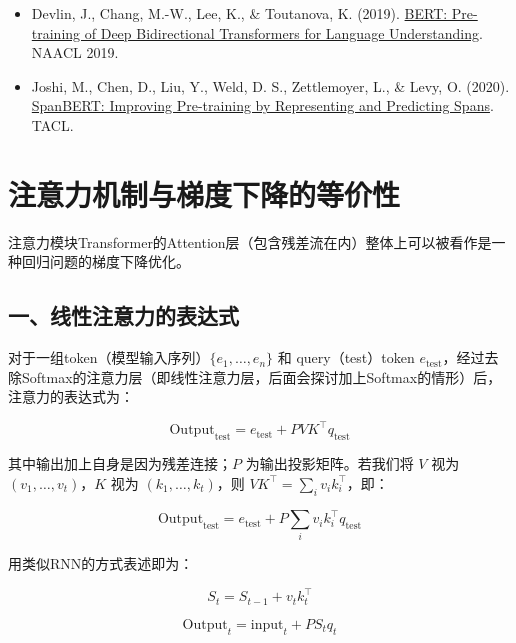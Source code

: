 \vspace{0.25em}
\begin{itemize}
\tightlist
\item
  Devlin, J., Chang, M.-W., Lee, K., \& Toutanova, K. (2019). \href{https://arxiv.org/abs/1810.04805}{BERT: Pre-training of Deep Bidirectional Transformers for Language Understanding}. NAACL 2019.
\item
  Joshi, M., Chen, D., Liu, Y., Weld, D. S., Zettlemoyer, L., \& Levy, O. (2020). \href{https://arxiv.org/abs/1907.10529}{SpanBERT: Improving Pre-training by Representing and Predicting Spans}. TACL.
\end{itemize}

\clearpage

\hypertarget{ux6ce8ux610fux529bux673aux5236ux4e0eux68afux5ea6ux4e0bux964dux7684ux7b49ux4ef7ux6027}{%
\section{注意力机制与梯度下降的等价性}\label{ux6ce8ux610fux529bux673aux5236ux4e0eux68afux5ea6ux4e0bux964dux7684ux7b49ux4ef7ux6027}}

注意力模块Transformer的Attention层（包含残差流在内）整体上可以被看作是一种回归问题的梯度下降优化。

\hypertarget{ux4e00ux7ebfux6027ux6ce8ux610fux529bux7684ux8868ux8fbeux5f0f}{%
\subsection{一、线性注意力的表达式}\label{ux4e00ux7ebfux6027ux6ce8ux610fux529bux7684ux8868ux8fbeux5f0f}}

对于一组token（模型输入序列）\(\{e_1,\ldots,e_n\}\) 和 query（test）token \(e_{\mathrm{test}}\)，经过去除Softmax的注意力层（即线性注意力层，后面会探讨加上Softmax的情形）后，注意力的表达式为：

\[
\mathrm{Output}_{\mathrm{test}}=e_{\mathrm{test}}+PVK^\top q_{\mathrm{test}}
\tag{1}
\]

其中输出加上自身是因为残差连接；\(P\) 为输出投影矩阵。若我们将 \(V\) 视为 \((v_1,\ldots,v_t)\)，\(K\) 视为 \((k_1,\ldots,k_t)\)，则 \(VK^\top=\sum_i v_i k_i^\top\)，即：

\[
\mathrm{Output}_{\mathrm{test}}=e_{\mathrm{test}}+P\sum_i v_i k_i^\top q_{\mathrm{test}}
\tag{2}
\]

用类似RNN的方式表述即为：

\[
S_t=S_{t-1}+v_t k_t^\top
\]

\[
\mathrm{Output}_t=\mathrm{input}_t+PS_tq_t
\]

